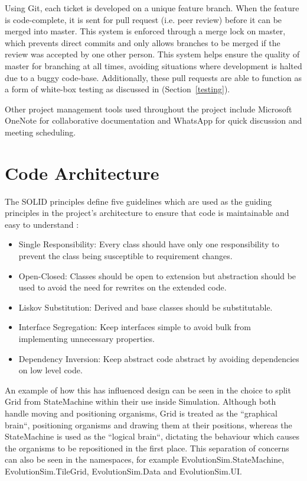 \documentclass[a4paper, oneside, 11pt]{report}
\begin{document}
Using Git, each ticket is developed on a unique feature branch. When the feature is code-complete, it is sent for pull request (i.e. peer review) before it can be merged into master. This system is enforced through a merge lock on master, which prevents direct commits and only allows branches to be merged if the review was accepted by one other person. This system helps ensure the quality of master for branching at all times, avoiding situations where development is halted due to a buggy code-base. Additionally, these pull requests are able to function as a form of white-box testing as discussed in (Section~\ref{testing}).

Other project management tools used throughout the project include Microsoft OneNote for collaborative documentation and WhatsApp for quick discussion and meeting scheduling.

\section{Code Architecture}\label{architecture}
The SOLID principles define five guidelines which are used as the guiding principles in the project's architecture to ensure that code is maintainable and easy to understand \cite{kelmendi}:
\begin{itemize}
	\item Single Responsibility: Every class should have only one responsibility to prevent the class being susceptible to requirement changes.
	\item Open-Closed: Classes should be open to extension but abstraction should be used to avoid the need for rewrites on the extended code.
	\item Liskov Substitution: Derived and base classes should be substitutable.
	\item Interface Segregation: Keep interfaces simple to avoid bulk from implementing unnecessary properties.
	\item Dependency Inversion: Keep abstract code abstract by avoiding dependencies on low level code.
\end{itemize}

An example of how this has influenced design can be seen in the choice to split Grid from StateMachine within their use inside Simulation. Although both handle moving and positioning organisms, Grid is treated as the ``graphical brain``, positioning organisms and drawing them at their positions, whereas the StateMachine is used as the ``logical brain``, dictating the behaviour which causes the organisms to be repositioned in the first place. This separation of concerns can also be seen in the namespaces, for example EvolutionSim.StateMachine, EvolutionSim.TileGrid, EvolutionSim.Data and EvolutionSim.UI.
\end{document}
